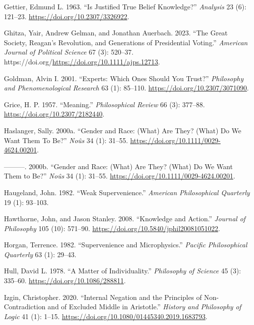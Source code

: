\documentclass[
  12pt,
  letterpaper,
  DIV=11,
  numbers=noendperiod]{scrartcl}
\newlength{\cslhangindent}
\newenvironment{CSLReferences}[2] %
 {\begin{list}{}{%
  \setlength{\itemindent}{0pt}
  \setlength{\leftmargin}{0pt}
  \setlength{\parsep}{0pt}
  \ifodd #1
   \setlength{\leftmargin}{\cslhangindent}
   \setlength{\itemindent}{-1\cslhangindent}
  \fi
  \setlength{\itemsep}{#2\baselineskip}}}
 {\end{list}}
\begin{document}
\begin{CSLReferences}{1}{0}
Gettier, Edmund L. 1963. {``Is Justified True Belief Knowledge?''}
\emph{Analysis} 23 (6): 121--23. \url{https://doi.org/10.2307/3326922}.

Ghitza, Yair, Andrew Gelman, and Jonathan Auerbach. 2023. {``The Great
Society, Reagan's Revolution, and Generations of Presidential Voting.''}
\emph{American Journal of Political Science} 67 (3): 520--37.
https://doi.org/\url{https://doi.org/10.1111/ajps.12713}.

Goldman, Alvin I. 2001. {``Experts: Which Ones Should You Trust?''}
\emph{Philosophy and Phenomenological Research} 63 (1): 85--110.
\url{https://doi.org/10.2307/3071090}.

Grice, H. P. 1957. {``Meaning.''} \emph{Philosophical Review} 66 (3):
377--88. \url{https://doi.org/10.2307/2182440}.

Haslanger, Sally. 2000a. {``Gender and Race: (What) Are They? (What) Do
We Want Them To Be?''} \emph{Noûs} 34 (1): 31--55.
\url{https://doi.org/10.1111/0029-4624.00201}.

---------. 2000b. {``Gender and Race: (What) Are They? (What) Do We Want
Them to Be?''} \emph{No{û}s} 34 (1): 31--55.
\url{https://doi.org/10.1111/0029-4624.00201}.

Haugeland, John. 1982. {``Weak Supervenience.''} \emph{American
Philosophical Quarterly} 19 (1): 93--103.

Hawthorne, John, and Jason Stanley. 2008. {``Knowledge and Action.''}
\emph{Journal of Philosophy} 105 (10): 571--90.
\url{https://doi.org/10.5840/jphil20081051022}.

Horgan, Terrence. 1982. {``Supervenience and Microphysics.''}
\emph{Pacific Philosophical Quarterly} 63 (1): 29--43.

Hull, David L. 1978. {``A Matter of Individuality.''} \emph{Philosophy
of Science} 45 (3): 335--60. \url{https://doi.org/10.1086/288811}.

Izgin, Christopher. 2020. {``Internal Negation and the Principles of
Non-Contradiction and of Excluded Middle in Aristotle.''} \emph{History
and Philosophy of Logic} 41 (1): 1--15.
\url{https://doi.org/10.1080/01445340.2019.1683793}.


\end{CSLReferences}
\end{document}
